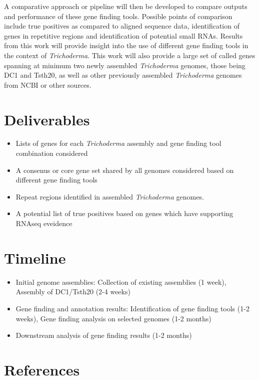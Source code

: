 \documentclass[12pt]{article}
\begin{document}
A comparative approach or pipeline will then be developed to compare
outputs and performance of these gene finding tools. Possible points
of comparison include true positives as compared to aligned sequence
data, identification of genes in repetitive regions and identification
of potential small RNAs. Results from this work will provide insight
into the use of different gene finding tools in the context of
\textit{Trichoderma}. This work will also provide a large set of
called genes spanning at minimum two newly assembled
\textit{Trichoderma} genomes, those being DC1 and Tsth20, as well as
other previously assembled \textit{Trichoderma} genomes from NCBI or
other sources.

\section{Deliverables}
\begin{itemize}
\item Lists of genes for each \textit{Trichoderma} assembly and gene
  finding tool combination considered
\item A consenus or core gene set shared by all genomes considered
  based on different gene finding tools
\item Repeat regions identified in assembled \textit{Trichoderma}
  genomes.
\item A potential list of true positives based on genes which have
  supporting RNAseq eveidence
\end{itemize}

\section{Timeline}
\begin{itemize}
\item Initial genome assemblies: Collection of existing assemblies (1 week), Assembly of DC1/Tsth20 (2-4 weeks)
\item Gene finding and annotation results: Identification of gene finding tools (1-2 weeks), Gene finding analysis on selected genomes (1-2 months)
\item Downstream analysis of gene finding results (1-2 months)
\end{itemize}

\section{References}
\end{document}
